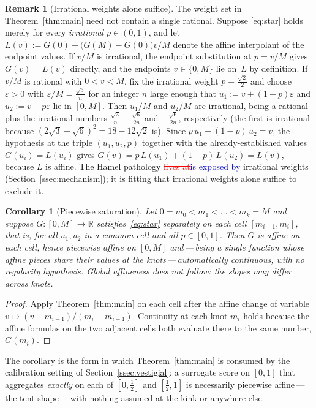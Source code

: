 \documentclass{article}
\newcommand{\ReviewAdd}[1]{\textcolor{blue}{#1}}
\newcommand{\ReviewDel}[1]{\textcolor{red}{\sout{#1}}}
\theoremstyle{plain}
\newtheorem{corollary}[theorem]{Corollary}
\theoremstyle{definition}
\newtheorem{remark}[theorem]{Remark}
\newcommand{\R}{\mathbb{R}}
\begin{document}
\begin{remark}[Irrational weights alone suffice]\label{rem:irrational}
The weight set in Theorem~\ref{thm:main} need not contain a single
rational. Suppose \eqref{eq:star} holds merely for every
\emph{irrational} $p\in(0,1)$, and let
$L(v):=G(0)+\bigl(G(M)-G(0)\bigr)v/M$ denote the affine interpolant of
the endpoint values. If $v/M$ is irrational, the endpoint substitution
at $p=v/M$ gives $G(v)=L(v)$ directly, and the endpoints $v\in\{0,M\}$
lie on~$L$ by definition. If $v/M$ is rational with
$0<v<M$, fix the irrational weight $p=\tfrac{\sqrt2}{2}$ and choose
$\varepsilon>0$ with $\varepsilon/M=\tfrac{\sqrt3}{n}$ for an integer
$n$ large enough that $u_1:=v+(1-p)\varepsilon$ and
$u_2:=v-p\varepsilon$ lie in $[0,M]$. Then $u_1/M$ and $u_2/M$ are
irrational, being a rational plus the irrational numbers
$\tfrac{\sqrt3}{n}-\tfrac{\sqrt6}{2n}$ and $-\tfrac{\sqrt6}{2n}$,
respectively (the first is irrational because
$(2\sqrt3-\sqrt6)^2=18-12\sqrt2$ is). Since $p\,u_1+(1-p)\,u_2=v$, the hypothesis at the
triple $(u_1,u_2,p)$ together with the already-established values
$G(u_i)=L(u_i)$ gives $G(v)=p\,L(u_1)+(1-p)\,L(u_2)=L(v)$, because $L$
is affine. The Hamel pathology \ReviewDel{lives at}\ReviewAdd{is exposed by} irrational weights
(Section~\ref{ssec:mechanism}); it is fitting that irrational weights
alone suffice to exclude it.
\end{remark}

\begin{corollary}[Piecewise saturation]\label{cor:piecewise}
Let $0=m_0<m_1<\dots<m_k=M$ and suppose $G\colon[0,M]\to\R$
satisfies~\eqref{eq:star} separately on each cell $[m_{i-1},m_i]$,
that is, for all $u_1,u_2$ in a common cell and all $p\in[0,1]$. Then
$G$ is affine on each cell, hence piecewise affine on $[0,M]$
and\,---\,being a single function whose affine pieces share their
values at the knots\,---\,automatically continuous, with no
regularity hypothesis. Global affineness does not follow: the slopes
may differ across knots.
\end{corollary}

\begin{proof}
Apply Theorem~\ref{thm:main} on each cell after the affine change of
variable $v\mapsto(v-m_{i-1})/(m_i-m_{i-1})$. Continuity at each knot
$m_i$ holds because the affine formulas on the two adjacent cells both
evaluate there to the same number, $G(m_i)$.
\end{proof}

\noindent The corollary is the form in which Theorem~\ref{thm:main}
is consumed by the calibration setting of
Section~\ref{ssec:vestigial}: a surrogate score on $[0,1]$ that
aggregates \emph{exactly} on each of $[0,\tfrac12]$ and $[\tfrac12,1]$
is necessarily piecewise affine\,---\,the tent shape\,---\,with
nothing assumed at the kink or anywhere else.
\end{document}
